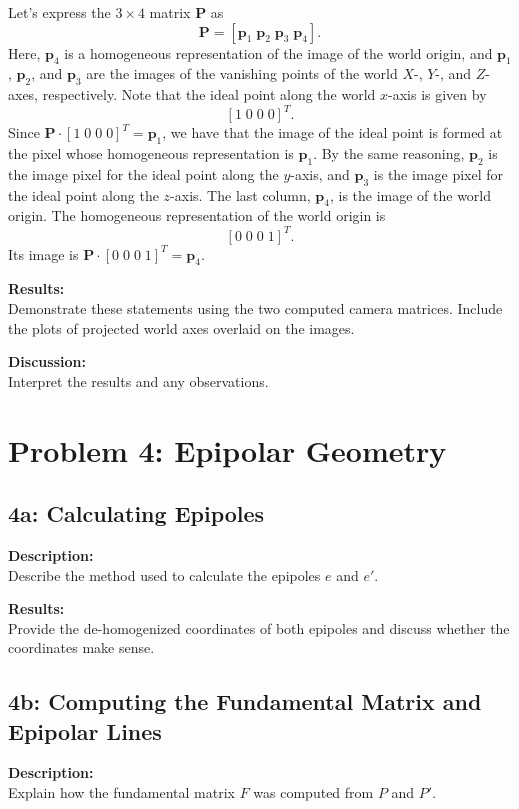 \documentclass{article}
\begin{document}
Let's express the $3 \times 4$ matrix $\mathbf{P}$ as
\[
\mathbf{P} = [\mathbf{p}_1 \; \mathbf{p}_2 \; \mathbf{p}_3 \; \mathbf{p}_4].
\]
Here, $\mathbf{p}_4$ is a homogeneous representation of the image of the world origin, and $\mathbf{p}_1$, $\mathbf{p}_2$, and $\mathbf{p}_3$ are the images of the vanishing points of the world $X$-, $Y$-, and $Z$-axes, respectively. Note that the ideal point along the world $x$-axis is given by
\[
[1 \; 0 \; 0 \; 0]^T.
\]
Since $\mathbf{P} \cdot [1 \; 0 \; 0 \; 0]^T = \mathbf{p}_1$, we have that the image of the ideal point is formed at the pixel whose homogeneous representation is $\mathbf{p}_1$. By the same reasoning, $\mathbf{p}_2$ is the image pixel for the ideal point along the $y$-axis, and $\mathbf{p}_3$ is the image pixel for the ideal point along the $z$-axis. The last column, $\mathbf{p}_4$, is the image of the world origin. The homogeneous representation of the world origin is
\[
[0 \; 0 \; 0 \; 1]^T.
\]
Its image is $\mathbf{P} \cdot [0 \; 0 \; 0 \; 1]^T = \mathbf{p}_4$.



\textbf{Results:} \\
Demonstrate these statements using the two computed camera matrices. Include the plots of projected world axes overlaid on the images.

\textbf{Discussion:} \\
Interpret the results and any observations.

\section{Problem 4: Epipolar Geometry}

\subsection{4a: Calculating Epipoles}
\textbf{Description:} \\
Describe the method used to calculate the epipoles \(e\) and \(e'\).

\textbf{Results:} \\
Provide the de-homogenized coordinates of both epipoles and discuss whether the coordinates make sense.

\subsection{4b: Computing the Fundamental Matrix and Epipolar Lines}
\textbf{Description:} \\
Explain how the fundamental matrix \(F\) was computed from \(P\) and \(P'\).
\end{document}
